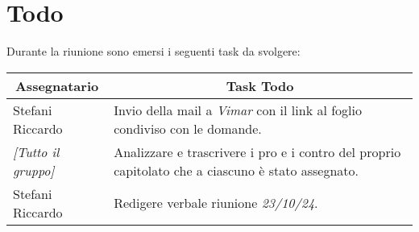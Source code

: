 \section{Todo}

Durante la riunione sono emersi i seguenti task da svolgere:

\vspace{0.5cm}

\begin{table}[htbp]
\begin{tabular}{|p{}|p{}|}
    \hline
    \multicolumn{1}{|c|}{\textbf{Assegnatario}} & \multicolumn{1}{|c|}{\textbf{Task Todo}} \\
    \hline
    Stefani Riccardo & Invio della mail a \emph{Vimar} con il link al foglio condiviso con le domande. \\
    \hline
    \emph{[Tutto il gruppo]} & Analizzare e trascrivere i pro e i contro del proprio capitolato che a ciascuno è stato assegnato. \\
    \hline
    Stefani Riccardo & Redigere verbale riunione \emph{23/10/24}. \\
    \hline
\end{tabular}
\end{table}